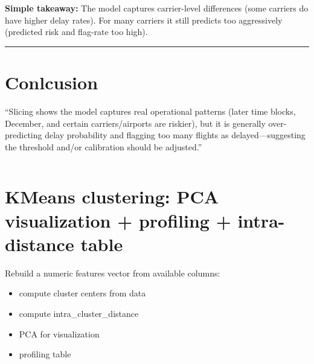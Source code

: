 \documentclass[11pt]{article}
\makeatletter
\providecommand{\tightlist}{%
      \setlength{\itemsep}{0pt}\setlength{\parskip}{0pt}}
\newcommand{\boxspacing}{\kern\kvtcb@left@rule\kern\kvtcb@boxsep}
\newcommand{\prompt}[4]{
        {\ttfamily\llap{{\color{#2}[#3]:\hspace{3pt}#4}}\vspace{-\baselineskip}}
    }
\makeatother
\begin{document}
\textbf{Simple takeaway:} The model captures carrier-level differences
(some carriers do have higher delay rates). For many carriers it still
predicts too aggressively (predicted risk and flag-rate too high).

\begin{center}\rule{0.5\linewidth}{0.5pt}\end{center}

\section{Conlcusion}\label{conlcusion}

``Slicing shows the model captures real operational patterns (later time
blocks, December, and certain carriers/airports are riskier), but it is
generally over-predicting delay probability and flagging too many
flights as delayed---suggesting the threshold and/or calibration should
be adjusted.''

    \begin{tcolorbox}[breakable, size=fbox, boxrule=1pt, pad at break*=1mm,colback=cellbackground, colframe=cellborder]
\prompt{In}{incolor}{ }{\boxspacing}
\begin{Verbatim}[commandchars=\\\{\}]

\end{Verbatim}
\end{tcolorbox}

    \section{KMeans clustering: PCA visualization + profiling +
intra-distance
table}\label{kmeans-clustering-pca-visualization-profiling-intra-distance-table}

    Rebuild a numeric features vector from available columns:

\begin{itemize}
\tightlist
\item
  compute cluster centers from data
\item
  compute intra\_cluster\_distance
\item
  PCA for visualization
\item
  profiling table
\end{itemize}
\end{document}

